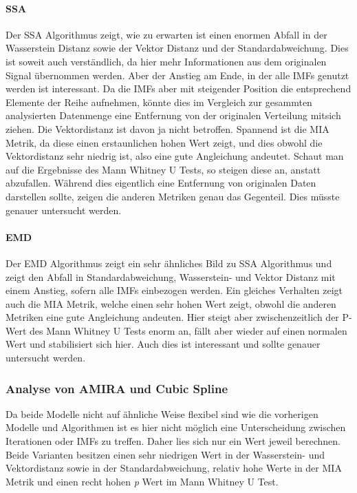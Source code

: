 \paragraph{\textbf{SSA}}
Der SSA Algorithmus zeigt, wie zu erwarten ist einen enormen Abfall in der Wasserstein Distanz sowie der Vektor Distanz und der Standardabweichung. Dies ist soweit auch verständlich, da hier mehr Informationen aus dem originalen Signal übernommen werden.
Aber der Anstieg am Ende, in der alle \ac{IMF}s genutzt werden ist interessant. Da die \ac{IMF}s aber mit steigender Position die entsprechend Elemente der Reihe aufnehmen, könnte dies im Vergleich zur gesammten analysierten Datenmenge eine Entfernung von der originalen Verteilung mitsich ziehen. Die Vektordistanz ist davon ja nicht betroffen.
Spannend ist die \ac{MIA} Metrik, da diese einen erstaunlichen hohen Wert zeigt, und dies obwohl die Vektordistanz sehr niedrig ist, also eine gute Angleichung andeutet. Schaut man auf die Ergebnisse des Mann Whitney U Tests, so steigen diese an, anstatt abzufallen. Während dies eigentlich eine Entfernung von originalen Daten darstellen sollte, zeigen die anderen Metriken genau das Gegenteil.
Dies müsste genauer untersucht werden.

\paragraph{\textbf{EMD}}
Der EMD Algorithmus zeigt ein sehr ähnliches Bild zu \ac{SSA} Algorithmus und zeigt den Abfall in  Standardabweichung, Wasserstein- und Vektor Distanz mit einem Anstieg, sofern alle \ac{IMF}s einbezogen werden.
Ein gleiches Verhalten zeigt auch die \ac{MIA} Metrik, welche einen sehr hohen Wert zeigt, obwohl die anderen Metriken eine gute Angleichung andeuten.
Hier steigt aber zwischenzeitlich der P-Wert des Mann Whitney U Tests enorm an, fällt aber wieder auf einen normalen Wert und stabilisiert sich hier. Auch dies ist interessant und sollte genauer untersucht werden.


\subsubsection{Analyse von AMIRA und Cubic Spline}
Da beide Modelle nicht auf ähnliche Weise flexibel sind wie die vorherigen Modelle und Algorithmen ist es hier nicht möglich eine Unterscheidung zwischen Iterationen oder \ac{IMF}s zu treffen.
Daher lies sich nur ein Wert jeweil berechnen.
Beide Varianten besitzen einen sehr niedrigen Wert in der Wasserstein- und Vektordistanz sowie in der Standardabweichung, relativ hohe Werte in der \ac{MIA} Metrik und einen recht hohen \textit{p} Wert im Mann Whitney U Test.



